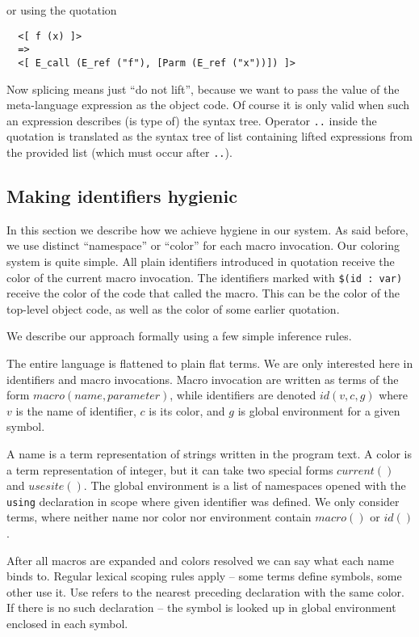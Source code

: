 \documentclass{llncs}
\begin{document}
\noindent
or using the quotation

\begin{verbatim}
  <[ f (x) ]> 
  =>
  <[ E_call (E_ref ("f"), [Parm (E_ref ("x"))]) ]>
\end{verbatim}

Now splicing means just ``do not lift'', because we want to pass the value of 
the meta-language expression as the object code. Of course it is only valid 
when such an expression describes (is type of) the syntax tree. Operator \verb,.., 
inside the quotation is translated as the syntax tree of list containing lifted 
expressions from the provided list (which must occur after \verb,..,).

\subsection{Making identifiers hygienic}
In this section we describe how we achieve hygiene in our system.
As said before, we use distinct ``namespace'' or ``color'' for each macro
invocation. Our coloring system is quite simple.  All plain identifiers
introduced in quotation receive the color of the current macro invocation. The
identifiers marked with \verb,$(id : var), receive the color of the code that %
called the macro. This can be the color of the top-level object code, as well
as the color of some earlier quotation.

We describe our approach formally using a few simple inference rules.

The entire language is flattened to plain flat terms. We are only
interested here in identifiers and macro invocations.  Macro invocation
are written as terms of the form $macro(name, parameter)$, while
identifiers are denoted $id(v,c,g)$ where $v$ is the name of identifier,
$c$ is its color, and $g$ is global environment for a given symbol.

A name is a term representation of strings written in the program text. A color
is a term representation of integer, but it can take two special forms
$current()$ and $usesite()$. The global environment is a list of namespaces
opened with the \verb,using, declaration in scope where given identifier
was defined. We only consider terms, where neither name nor color nor environment
contain $macro()$ or $id()$.

After all macros are expanded and colors resolved we can say what each
name binds to. Regular lexical scoping rules apply -- some terms define
symbols, some other use it. Use refers to the nearest preceding declaration
with the same color. If there is no such declaration -- the symbol is
looked up in global environment enclosed in each symbol.
\end{document}
